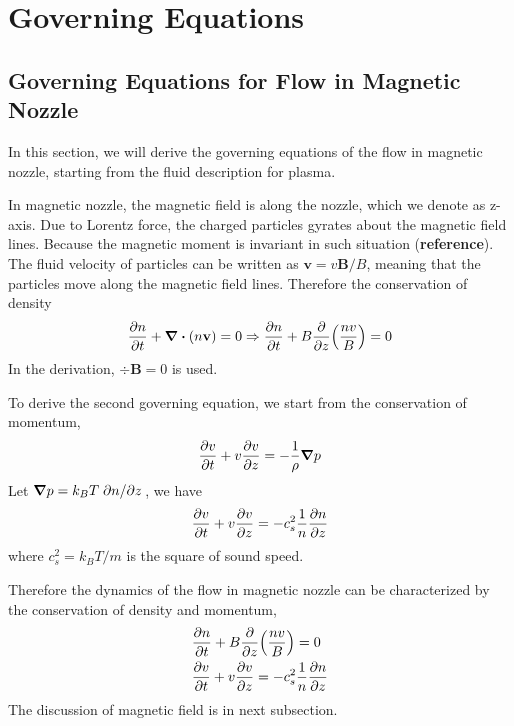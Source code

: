 \chapter{Governing Equations} \label{chap:governing_equations}
\section{Governing Equations for Flow in Magnetic Nozzle}
In this section, we will derive the governing equations of the flow in magnetic nozzle, starting from the fluid description for plasma.

In magnetic nozzle, the magnetic field is along the nozzle, which we denote as z-axis. Due to Lorentz force, the charged particles gyrates about the magnetic field lines. Because the magnetic moment is invariant in such situation (\textbf{reference}). The fluid velocity of particles can be written as $\mathbf{v} = v\mathbf{B}/B$, meaning that the particles move along the magnetic field lines. Therefore the conservation of density 
\[ 
\pdv{n}{t} + \div(n\mathbf{v}) = 0 
\Rightarrow 
\pdv{n}{t} + B\pdv{z}(\frac{nv}{B}) = 0  
\]
In the derivation, $\div{\mathbf{B}} = 0$ is used.

To derive the second governing equation, we start from the conservation of momentum, 
\[ \pdv{v}{t} + v\pdv{v}{z} = -\frac{1}{\rho}\grad{p} \]
Let $\grad{p} = k_BT\pdv*{n}{z}$, we have
\[ \pdv{v}{t} + v\pdv{v}{z} = -c_s^2\frac{1}{n}\pdv{n}{z} \]
where $c_s^2 = k_BT/m$ is the square of sound speed.

Therefore the dynamics of the flow in magnetic nozzle can be characterized by the conservation of density and momentum,
\begin{align*}
	&\pdv{n}{t} + B\pdv{z}(\frac{nv}{B}) = 0\\
	&\pdv{v}{t} + v\pdv{v}{z} = -c_s^2\frac{1}{n}\pdv{n}{z}
\end{align*}
The discussion of magnetic field is in next subsection.


